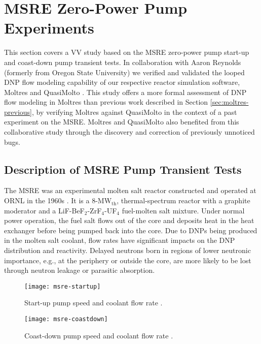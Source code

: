 \section{MSRE Zero-Power Pump Experiments} \label{sec:msre-pump}

This section covers a \gls{VV} study based on the \gls{MSRE} zero-power pump
start-up and coast-down pump transient tests. In collaboration with Aaron Reynolds (formerly from
Oregon State University) we verified and validated the looped \gls{DNP} flow modeling capability of
our respective reactor simulation software, Moltres and QuasiMolto \cite{reynolds_analysis_2023}.
This study offers a more formal assessment of \gls{DNP} flow modeling in Moltres than previous
work described in Section \ref{sec:moltres-previous}, by verifying Moltres against QuasiMolto in
the context of a past experiment on the \gls{MSRE}. Moltres and QuasiMolto also benefited from this
collaborative study through the discovery and correction of previously unnoticed bugs.

\subsection{Description of MSRE Pump Transient Tests}

The \gls{MSRE} was an experimental molten salt reactor constructed and operated at \gls{ORNL} in
the 1960s \cite{haubenreich_experience_1970}. It is a 8-MW$_{\text{th}}$, thermal-spectrum reactor
with a graphite moderator and a LiF-BeF$_2$-ZrF$_4$-UF$_4$ fuel-molten salt mixture. Under normal
power operation, the fuel salt flows out of the core and deposits heat in the heat exchanger before
being pumped back into the core. Due to
\glspl{DNP} being produced in the molten salt coolant, flow rates have significant impacts on the
\gls{DNP} distribution and reactivity. Delayed neutrons born in regions of lower neutronic
importance, e.g., at the periphery or outside the core, are more likely to be lost through neutron
leakage or parasitic absorption.

\begin{figure}[htb]
  \centering
  \begin{minipage}[t]{0.49\textwidth}
    \centering
    \texttt{[image: msre-startup]}
    \caption{Start-up pump speed and coolant flow rate \cite{prince_zero-power_1968}.}
    \label{fig:msre-startup}
  \end{minipage}
  \hfill
  \begin{minipage}[t]{0.49\textwidth}
    \centering
    \texttt{[image: msre-coastdown]}
    \caption{Coast-down pump speed and coolant flow rate \cite{prince_zero-power_1968}.}
    \label{fig:msre-coastdown}
  \end{minipage}
\end{figure}

